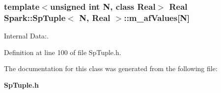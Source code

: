 \subsubsection{\setlength{\rightskip}{0pt plus 5cm}template$<$unsigned int N, class Real$>$ Real {\bf Spark::Sp\-Tuple}$<$ N, Real $>$::{\bf m\_\-af\-Values}[N]\hspace{0.3cm}{\tt  [protected]}}\label{classSpark_1_1SpTuple_p0}


Internal Data:. 

Definition at line 100 of file Sp\-Tuple.h.

The documentation for this class was generated from the following file:\begin{CompactItemize}
\item 
{\bf Sp\-Tuple.h}\end{CompactItemize}
